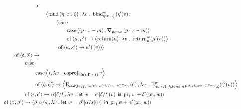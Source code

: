 \documentclass[11pt,a4paper]{article}
\theoremstyle{definition}
\theoremstyle{remark}
\providecommand{\casubst}[3]{#1[#3/#2]}
\providecommand{\letst}[3]{\mathsf{let}\;#1=#2\;\mathsf{in}\;#3}
\begin{document}
{\begin{alignat*}{2}
    \\
    &\qquad \qquad \qquad \qquad
      \opn[b]{in}
    \\
    &\qquad \qquad \qquad \qquad \qquad
      \left\langle
      \opn[b]{bind}
      \left(
      \eta; x \; . \; \xi
      \right),
      \lambda v \; . \;
      \opn[b]{bind}_{\eta; x \; . \; \xi}^{w}
      \left(
      \fn[n]{ \eta' }{ v };
      \right. 
      \right.
    \\
    &\qquad \qquad \qquad \qquad \qquad \qquad
      \left(
      \opn[b]{case}
      \right.
      \\
    &\qquad \qquad \qquad \qquad \qquad \qquad \qquad
      \opn[b]{case}
      \tuple{ \left( p \cdot x - m \right), \grad_{p, m, x} \left( p \cdot x - m \right) }
      \\
    &\qquad \qquad \qquad \qquad \qquad \qquad \qquad
      \opn[b]{of} \tuple{ \mu, \mu' } \to
      \tuple{
      \fn[n]{ \opn[b]{return} }{ \mu },
      \lambda v \; . \;
      \fn[n]{ \opn[b]{return}^{w}_{\mu} }{ \fn[n]{ \mu' }{ v } }
      }
      \\
    &\qquad \qquad \qquad \qquad \qquad \qquad
      \left.
      \left.\left.
      \opn[b]{of} \tuple{ \kappa, \kappa' } \to \kappa'
      \right) 
      \left( v \right)
      \right) 
      \right\rangle
    \\
    &\qquad \qquad
      \opn[b]{of} \tuple{ \delta, \delta' } \to
    \\
    &\qquad \qquad \qquad
      \opn[b]{case}
    \\
    &\qquad \qquad \qquad \qquad
      \opn[b]{case}
      \tuple{ t, \lambda v \; . \; \opn[b]{coproj}_{\fn[n]{ \opn{idx} }{ t; \Gamma, s, t }} v}
    \\
    &\qquad \qquad \qquad \qquad
      \opn[b]{of} \tuple{ \zeta, \zeta' } \to
      \tuple{
      \fn[n]{ \opn[b]{E}_{\srcreal} }{ \zeta },
      \lambda v \; . \; 
      \fn[n]{ \opn[b]{E}_{\srcreal, \zeta}^{w} }{ \fn[n]{ \zeta' }{ v } }
      }
    \\
    &\qquad \qquad \qquad
      \opn[b]{of} \tuple{ \epsilon, \epsilon' } \to
      \tuple{
      \casubst{\epsilon}{t}{\delta},
      \lambda v \; . \;
      \letst{w}{
      \fn[n]{ \casubst{\epsilon'}{t}{\delta} }{ v }
      }{
      \opn[b]{pr}_{1} w + \fn[n]{ \delta' }{ \opn[b]{pr}_{2} w }
      }
      }
    \\
    &\qquad
      \opn[b]{of} \tuple{ \beta, \beta' } \to
      \tuple{
      \casubst{\beta}{s}{\alpha},
      \lambda v \; . \;
      \letst{ w }{ \fn[n]{ \casubst{\beta'}{s}{\alpha} }{v} }{
      \opn[b]{pr}_{1} w + \fn[n]{ \alpha' }{ \opn[b]{pr}_{2} w }
      } 
      }
  \end{alignat*}
}
\end{document}
